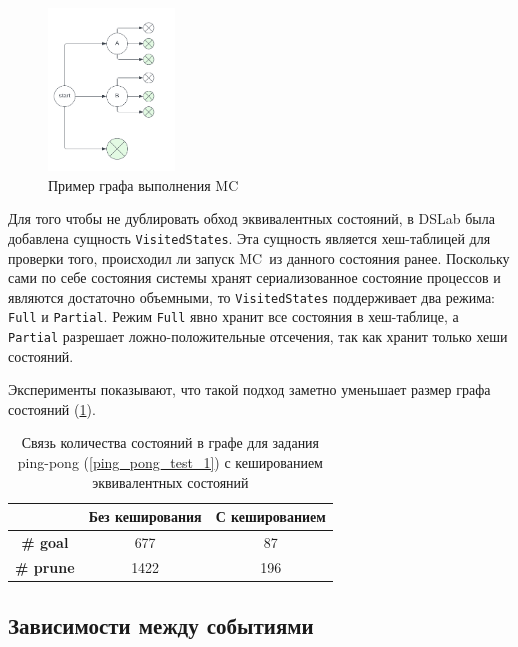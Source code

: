 \documentclass[a4paper,12pt]{extarticle}
\newcommand{\mc}[0]{MC}
\begin{document}
\begin{figure}
    \begin{center}
        \includegraphics[width=0.3\textwidth]{img/mc_graph_example.png}
        \caption{Пример графа выполнения \mc}
        \label{mcgraph}
    \end{center}
\end{figure}

Для того чтобы не дублировать обход эквивалентных состояний, в DSLab была добавлена сущность \texttt{VisitedStates}.
Эта сущность является хеш-таблицей для проверки того, происходил ли запуск \mc\ из данного состояния ранее.
Поскольку сами по себе состояния системы хранят сериализованное состояние процессов и являются достаточно объемными, то \texttt{VisitedStates} поддерживает два режима: \texttt{Full} и \texttt{Partial}.
Режим \texttt{Full} явно хранит все состояния в хеш-таблице, а \texttt{Partial} разрешает ложно-положительные отсечения, так как хранит только хеши состояний.

Эксперименты показывают, что такой подход заметно уменьшает размер графа состояний (\cref{tab2}).

\begin{table}[htbp]
	\caption{Связь количества состояний в графе для задания ping-pong (\cref{ping_pong_test_1}) с кешированием эквивалентных состояний}
    \begin{center}
    \begin{tabular}{|c|c|c|}
    \hline
     & \textbf{Без кеширования} & \textbf{С кешированием}  \\
    \hline
    \textbf{\# goal} & 677 & 87 \\
    \hline
    \textbf{\# prune} & 1422 & 196 \\
    \hline
    \end{tabular}
    \label{tab2}
    \end{center}
\end{table}

\subsection{Зависимости между событиями}
\label{dependencies}
\end{document}
